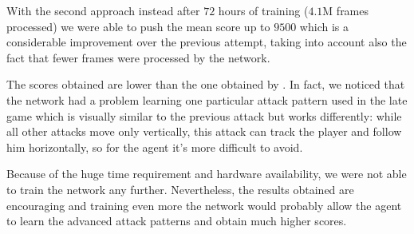 \documentclass[10pt,twocolumn,letterpaper]{article}
\begin{document}
With the second approach instead after $72$ hours of training ($4.1$M frames processed) we were able to push the mean score up to $9500$ which is a considerable improvement over the previous attempt, taking into account also the fact that fewer frames were processed by the network.

The scores obtained are lower than the one obtained by \cite{DBLP:journals/corr/abs-1710-02298}. In fact, we noticed that the network had a problem learning one particular attack pattern used in the late game which is visually similar to the previous attack but works differently: while all other attacks move only vertically, this attack can track the player and follow him horizontally, so for the agent it's more difficult to avoid.

Because of the huge time requirement and hardware availability, we were not able to train the network any further. Nevertheless, the results obtained are encouraging and training even more the network would probably allow the agent to learn the advanced attack patterns and obtain much higher scores.

{\small


}
\end{document}
